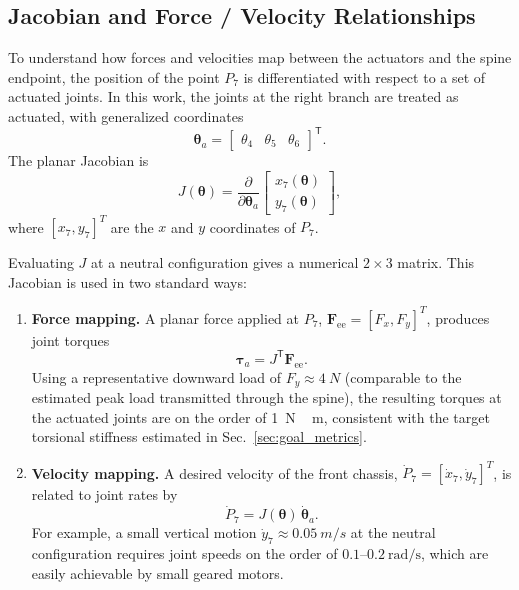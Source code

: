 \documentclass[11pt,letterpaper]{article}
\begin{document}
\subsection{Jacobian and Force / Velocity Relationships}

To understand how forces and velocities map between the actuators and the
spine endpoint, the position of the point $P_7$ is differentiated with respect
to a set of actuated joints. In this work, the joints at the right branch are
treated as actuated, with generalized coordinates
\begin{equation}
    \boldsymbol{\theta}_a =
    \begin{bmatrix}
        \theta_4 & \theta_5 & \theta_6
    \end{bmatrix}^{\mathsf{T}}.
\end{equation}
The planar Jacobian is
\begin{equation}
    J(\boldsymbol{\theta}) =
    \frac{\partial}{\partial\boldsymbol{\theta}_a}
    \begin{bmatrix}
        x_7(\boldsymbol{\theta}) \\
        y_7(\boldsymbol{\theta})
    \end{bmatrix},
\end{equation}
where $[x_7,y_7]^T$ are the $x$ and $y$ coordinates of $P_7$.

Evaluating $J$ at a neutral configuration gives a numerical $2\times 3$
matrix. This Jacobian is used in two standard ways:
\begin{enumerate}
    \item \textbf{Force mapping.}  
    A planar force applied at $P_7$,
    $\mathbf{F}_{\text{ee}} = [F_x,F_y]^T$, produces joint torques
    \begin{equation}
        \boldsymbol{\tau}_a = J^{\mathsf{T}} \mathbf{F}_{\text{ee}}.
    \end{equation}
    Using a representative downward load of $F_y \approx \SI{4}{N}$ (comparable
    to the estimated peak load transmitted through the spine), the resulting
    torques at the actuated joints are on the order of
    \SI{1}{N\,m}, consistent with the target torsional stiffness estimated in
    Sec.~\ref{sec:goal_metrics}.
    \item \textbf{Velocity mapping.}  
    A desired velocity of the front chassis,
    $\dot{P}_7 = [\dot{x}_7,\dot{y}_7]^T$, is related to joint rates by
    \begin{equation}
        \dot{P}_7 = J(\boldsymbol{\theta}) \,\dot{\boldsymbol{\theta}}_a.
    \end{equation}
    For example, a small vertical motion
    $\dot{y}_7 \approx \SI{0.05}{m/s}$ at the neutral configuration requires
    joint speeds on the order of $0.1$--$0.2~\text{rad/s}$, which are easily
    achievable by small geared motors.
\end{enumerate}
\end{document}
